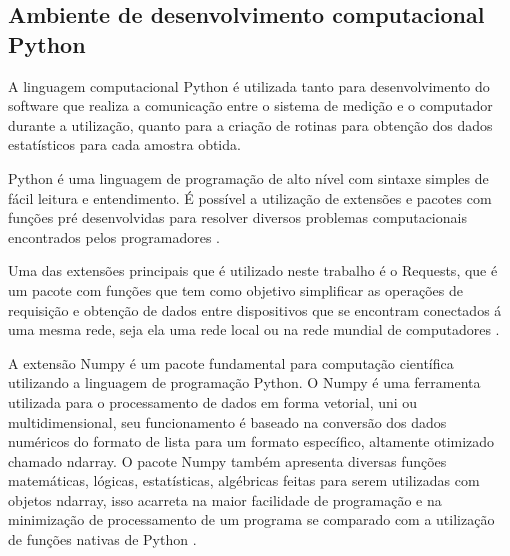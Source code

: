 %
%
%
%
%
%

\subsection{Ambiente de desenvolvimento computacional Python}

A linguagem computacional Python é utilizada tanto para desenvolvimento do software que realiza a comunicação entre o sistema de medição e o computador durante a utilização,
quanto para a criação de rotinas para obtenção dos dados estatísticos para cada amostra obtida.

Python é uma linguagem de programação de alto nível com sintaxe simples de fácil leitura e entendimento.
É possível a utilização de extensões e pacotes com funções pré desenvolvidas para resolver diversos problemas computacionais encontrados pelos programadores \autocite{TimHall2010}.

Uma das extensões principais que é utilizado neste trabalho é o Requests, que é um pacote com funções que tem como objetivo simplificar as operações de requisição e obtenção de dados entre dispositivos
que se encontram conectados á uma mesma rede, seja ela uma rede local ou na rede mundial de computadores \autocite{DocsRequests}.

A extensão Numpy é um pacote fundamental para computação científica utilizando a linguagem de programação Python.
O Numpy é uma ferramenta utilizada para o processamento de dados em forma vetorial, uni ou multidimensional, seu funcionamento é baseado na conversão dos dados numéricos do formato de lista para um
formato específico, altamente otimizado chamado ndarray.
O pacote Numpy também apresenta diversas funções matemáticas, lógicas, estatísticas, algébricas feitas para serem utilizadas com objetos ndarray, isso acarreta na maior facilidade de programação e
na minimização de processamento de um programa se comparado com a utilização de funções nativas de Python \autocite{DocsNumPy}.


